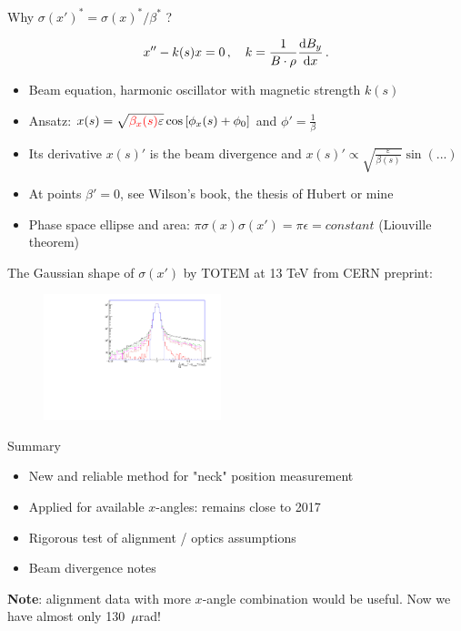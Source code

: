 \documentclass{beamer}
\begin{document}
\begin{frame}\scriptsize
	\begin{block}{Why $\sigma(x')^{*}=\sigma(x)^{*}/\beta^{*}$ ?}\scriptsize

		\begin{equation}
		    x^{\prime\prime}-k(s)x=0\,,\,\,\,\,\,\,k = \frac{1}{B\cdot\rho} \frac{{\rm d} B_{y}}{{\rm d}x}\,.
		\label{Hillsequation}
		\end{equation}
		\begin{itemize}
			\item Beam equation, harmonic oscillator with magnetic strength $k(s)$
			\item Ansatz: $x(s)=\sqrt{{\color{red}\beta_x(s)}\varepsilon}\cos\left[\phi_x(s)+\phi_0\right]$ and $\phi'=\frac{1}{\beta}$
			\item Its derivative $x(s)'$ is {\color{blue} the beam divergence} and $x(s)'\propto \sqrt{\frac{\varepsilon}{\beta(s)}}\sin(...)$ 
			\item At points $\beta'=0$, see Wilson's book, the thesis of Hubert or mine
			\item Phase space ellipse and area: $\pi\sigma(x)\sigma(x')=\pi\epsilon=constant$ (Liouville theorem)
		\end{itemize}\vspace{2mm}
		The Gaussian shape of $\sigma(x')$ by TOTEM at 13 TeV from CERN preprint:
		\begin{figure}
			\includegraphics[width=0.46\textwidth]{signal_to_bkg_fill_4496_data_from_cut_definition.pdf}
		\end{figure}\vspace{-4mm}
	\end{block}

	
\end{frame}

\begin{frame}\scriptsize
	\begin{block}{Summary}\scriptsize

		\begin{itemize}
			\item New and reliable method for "neck" position measurement
			\item Applied for available $x$-angles: remains close to 2017 
			\item Rigorous test of alignment / optics assumptions
			\item Beam divergence notes
		\end{itemize}\vspace{10mm}
		{\bf Note}: alignment data with more $x$-angle combination would be useful. Now we have almost only 130~$\mu$rad!
	\end{block}

	
\end{frame}
\end{document}
